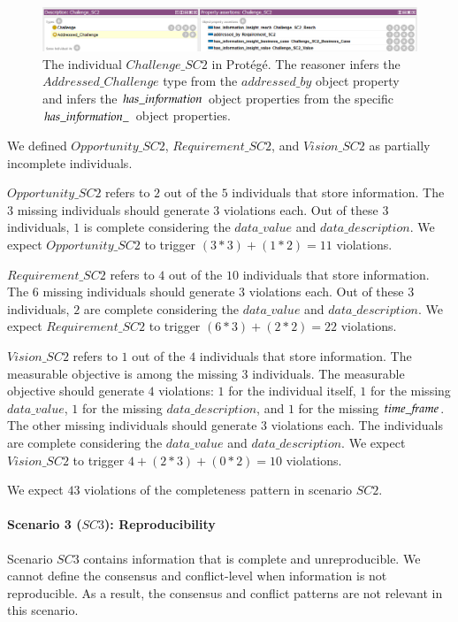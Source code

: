 \begin{figure}[H]
\centering
  \includegraphics[width=17cm]{../../Images/05_Validation/05_RP_SC2_Challenge_SC2.png}
  \caption{The individual $Challenge\_SC2$ in Prot\'eg\'e. The reasoner infers the $Addressed\_Challenge$ type from the $addressed\_by$ object property and infers the $has\_in{\mkern-2mu f\mkern-3mu}ormation$ object properties from the specific $has\_in{\mkern-2mu f\mkern-3mu}ormation\_$ object properties.}
  \label{fig:RP_SC2_Challenge_SC2}
\end{figure}

We defined $Opportunity\_SC2$, $Requirement\_SC2$, and $Vision\_SC2$ as partially incomplete individuals. 

$Opportunity\_SC2$ refers to $2$ out of the $5$ individuals that store information. The $3$ missing individuals should generate $3$ violations each. Out of these $3$ individuals, $1$ is complete considering the $data\_value$ and $data\_description$. We expect $Opportunity\_SC2$ to trigger $(3*3)+(1*2)=11$ violations. 

$Requirement\_SC2$ refers to $4$ out of the $10$ individuals that store information. The $6$ missing individuals should generate $3$ violations each. Out of these $3$ individuals, $2$ are complete considering the $data\_value$ and $data\_description$. We expect $Requirement\_SC2$ to trigger $(6*3)+(2*2)=22$ violations. 

$Vision\_SC2$ refers to $1$ out of the $4$ individuals that store information. The measurable objective is among the missing $3$ individuals. The measurable objective should generate $4$ violations: $1$ for the individual itself, $1$ for the missing $data\_value$, $1$ for the missing $data\_description$, and $1$ for the missing $time\_{\mkern-2mu f\mkern-3mu}rame$. The other missing individuals should generate $3$ violations each. The individuals are complete considering the $data\_value$ and $data\_description$. We expect $Vision\_SC2$ to trigger $4+(2*3)+(0*2)=10$ violations. 

We expect $43$ violations of the completeness pattern in scenario $SC2$.

\paragraph{Scenario 3 ($SC3$): Reproducibility}
Scenario $SC3$ contains information that is complete and unreproducible. We cannot define the consensus and conflict-level when information is not reproducible. As a result, the consensus and conflict patterns are not relevant in this scenario. 

